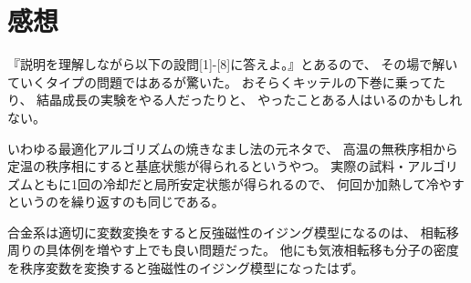 \documentclass[../ap_2008.tex]{subfiles}
\begin{document}
\section*{感想}
『説明を理解しながら以下の設問[1]-[8]に答えよ。』とあるので、
その場で解いていくタイプの問題ではあるが驚いた。
おそらくキッテルの下巻に乗ってたり、
結晶成長の実験をやる人だったりと、
やったことある人はいるのかもしれない。

いわゆる最適化アルゴリズムの焼きなまし法の元ネタで、
高温の無秩序相から定温の秩序相にすると基底状態が得られるというやつ。
実際の試料・アルゴリズムともに1回の冷却だと局所安定状態が得られるので、
何回か加熱して冷やすというのを繰り返すのも同じである。

合金系は適切に変数変換をすると反強磁性のイジング模型になるのは、
相転移周りの具体例を増やす上でも良い問題だった。
他にも気液相転移も分子の密度を秩序変数を変換すると強磁性のイジング模型になったはず。
\end{document}
